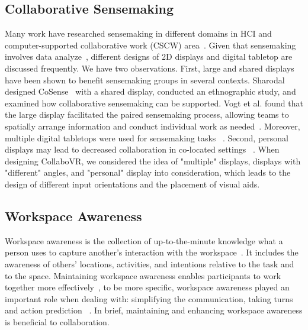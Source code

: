 \documentclass{sigchi}
\begin{document}
\subsection{Collaborative Sensemaking}
Many work have researched sensemaking in different domains in HCI and computer-supported collaborative work (CSCW) area~\cite{albolino2007sensemaking, billman2007medical, landgren2007study,paul2009understanding}. Given that sensemaking involves data analyze~\cite{yi2008understanding}, different designs of 2D displays and digital tabletop are discussed frequently. We have two observations. First, large and shared displays have been shown to benefit sensemaking groups in several contexts. Sharodal designed CoSense~\cite{dervin1992mind} with a shared display, conducted an ethnographic study, and examined how collaborative sensemaking can be supported. Vogt et al. found that the large display facilitated the paired sensemaking process, allowing teams to spatially arrange information and conduct individual work as needed~\cite{vogt2011co}. Moreover, multiple digital tabletops were used for sensemaking tasks ~\cite{isenberg2010exploratory,morris2010wesearch}. Second, personal displays may lead to decreased collaboration in co-located settings ~\cite{chung2013investigating, wallace2009investigating}.
When designing CollaboVR, we considered the idea of "multiple" displays, displays with "different" angles, and "personal" display into consideration, which leads to the design of different input orientations and the placement of visual aids.

\subsection{Workspace Awareness}
Workspace awareness is the collection of up-to-the-minute knowledge what a person uses to capture another's interaction with the workspace~\cite{gutwin1996workspace}. It includes the awareness of others' locations, activities, and intentions relative to the task and to the space. Maintaining workspace awareness enables participants to work together more effectively~\cite{gutwin1998design, gutwin2002descriptive}, to be more specific, workspace awareness played an important role when dealing with: simplifying the communication, taking turns and action prediction ~\cite{gutwin2002descriptive}. In brief, maintaining and enhancing workspace awareness is beneficial to collaboration. 
\end{document}
